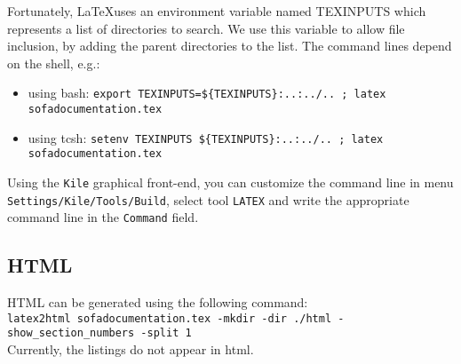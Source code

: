 \documentclass[a4paper,10pt]{report}
\begin{document}
Fortunately, \LaTeX uses an environment variable named TEXINPUTS which represents a list of directories to search. We use this variable to allow file inclusion, by adding the parent directories to the list. The command lines depend on the shell, e.g.:
\begin{itemize}
 \item using bash: \texttt{export TEXINPUTS=\$\{TEXINPUTS\}:..:../.. ; latex sofadocumentation.tex}
 \item using tcsh: \texttt{setenv TEXINPUTS \$\{TEXINPUTS\}:..:../.. ; latex sofadocumentation.tex}
\end{itemize}

Using the \texttt{Kile} graphical front-end, you can customize the command line in menu \texttt{Settings/Kile/Tools/Build}, select tool \texttt{LATEX} and write the appropriate command line in the \texttt{Command} field.

\subsection{HTML}
HTML can be generated using the following command:\\
\texttt{latex2html sofadocumentation.tex -mkdir -dir ./html -show\_section\_numbers -split 1}
\\
Currently, the listings do not appear in html.
\end{document}
